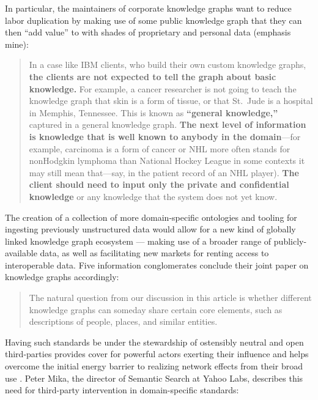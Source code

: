 In particular, the maintainers of corporate knowledge graphs want to
reduce labor duplication by making use of some public knowledge graph
that they can then ``add value'' to with shades of proprietary and
personal data (emphasis mine):

\begin{quote}
In a case like IBM clients, who build their own custom knowledge graphs,
\textbf{the clients are not expected to tell the graph about basic
knowledge.} For example, a cancer researcher is not going to teach the
knowledge graph that skin is a form of tissue, or that St.~Jude is a
hospital in Memphis, Tennessee. This is known as \textbf{``general
knowledge,''} captured in a general knowledge graph. \textbf{The next
level of information is knowledge that is well known to anybody in the
domain}---for example, carcinoma is a form of cancer or NHL more often
stands for nonHodgkin lymphoma than National Hockey League in some
contexts it may still mean that---say, in the patient record of an NHL
player). \textbf{The client should need to input only the private and
confidential knowledge} or any knowledge that the system does not yet
know. \cite{noyIndustryscaleKnowledgeGraphs2019} 
\end{quote}

The creation of a collection of more domain-specific ontologies and
tooling for ingesting previously unstructured data would allow for a new
kind of globally linked knowledge graph ecosystem --- making use of a
broader range of publicly-available data, as well as facilitating new
markets for renting access to interoperable data. Five information
conglomerates conclude their joint paper on knowledge graphs
accordingly:

\begin{quote}
The natural question from our discussion in this article is whether
different knowledge graphs can someday share certain core elements, such
as descriptions of people, places, and similar entities. \cite{noyIndustryscaleKnowledgeGraphs2019} 
\end{quote}

Having such standards be under the stewardship of ostensibly neutral and
open third-parties provides cover for powerful actors exerting their
influence and helps overcome the initial energy barrier to realizing
network effects from their broad use \cite{wiegmannMultiModeStandardisationCritical2017, heiresInternationalOrganizationStandardization2008} . Peter Mika, the
director of Semantic Search at Yahoo Labs, describes this need for
third-party intervention in domain-specific standards:

